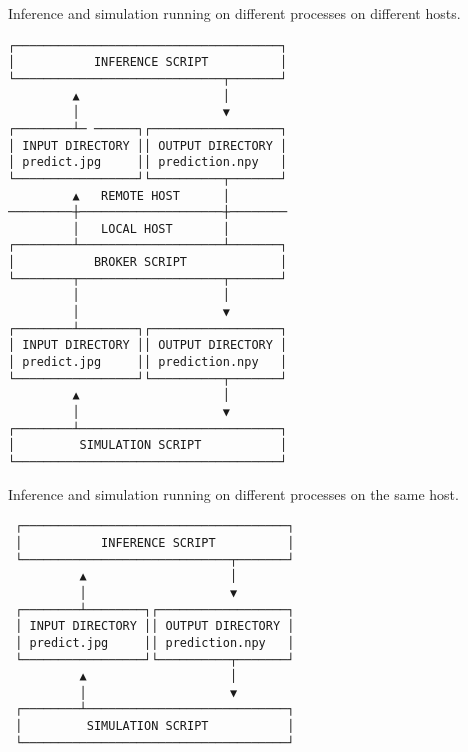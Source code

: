 Inference and simulation running on different processes on different hosts.
\begin{verbatim}
┌─────────────────────────────────────┐ 
│           INFERENCE SCRIPT          │ 
└─────────────────────────────┬───────┘ 
         ▲                    │         
         │                    ▼         
┌────────┴─ ──────┐┌──────────────────┐ 
│ INPUT DIRECTORY ││ OUTPUT DIRECTORY │ 
│ predict.jpg     ││ prediction.npy   │ 
└─────────────────┘└──────────┬───────┘ 
         ▲   REMOTE HOST      │         
─────────┼────────────────────┼──────── 
         │   LOCAL HOST       │         
┌────────┴────────────────────┴───────┐ 
│           BROKER SCRIPT             │ 
└────────┬────────────────────┬───────┘ 
         │                    │         
         │                    ▼         
┌────────┴────────┐┌──────────────────┐ 
│ INPUT DIRECTORY ││ OUTPUT DIRECTORY │ 
│ predict.jpg     ││ prediction.npy   │ 
└─────────────────┘└──────────┬───────┘ 
         ▲                    │         
         │                    ▼         
┌────────┴────────────────────────────┐ 
│         SIMULATION SCRIPT           │ 
└─────────────────────────────────────┘ 
\end{verbatim}                                        
                                        
Inference and simulation running on different processes on the same host.                                        
\begin{verbatim}                                    
 ┌─────────────────────────────────────┐
 │           INFERENCE SCRIPT          │
 └─────────────────────────────┬───────┘
          ▲                    │        
          │                    ▼        
 ┌────────┴────────┐┌──────────────────┐
 │ INPUT DIRECTORY ││ OUTPUT DIRECTORY │
 │ predict.jpg     ││ prediction.npy   │
 └─────────────────┘└──────────┬───────┘
          ▲                    │        
          │                    ▼        
 ┌────────┴────────────────────────────┐
 │         SIMULATION SCRIPT           │     
 └─────────────────────────────────────┘
\end{verbatim}